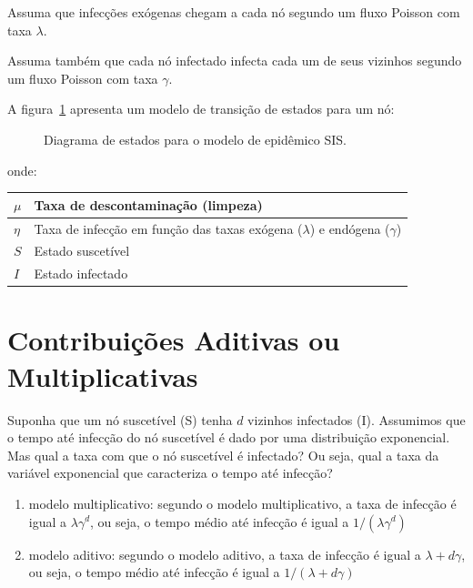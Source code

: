\documentclass[a4paper]{article}
\begin{document}
Assuma que infecções exógenas chegam a cada nó segundo um fluxo Poisson com taxa $\lambda$.   

Assuma também que cada nó infectado infecta cada um de seus vizinhos segundo um fluxo Poisson com taxa $\gamma$.

A figura~\ref{fig:SISmodel} apresenta um modelo de transição de estados para um nó:

\begin{figure}[!htb]
\begin{center}
 
\caption{Diagrama de estados para o modelo de epidêmico SIS.}
\label{fig:SISmodel}
\end{center}
\end{figure} 

onde:
\begin{table}[!htb]
\center
	\begin{tabular}{|l|l|}
    \hline
	$\mu$	&	Taxa de descontaminação (limpeza)	\\ 
    \hline
	$\eta$	&	Taxa de infecção em função das taxas exógena ($\lambda$) e endógena ($\gamma$)\\ 
    \hline
	$S$		&	Estado suscetível \\ 
    \hline
	$I$		&	Estado infectado \\
    \hline
	\end{tabular} 
\end{table}


\section{Contribuições Aditivas ou Multiplicativas}

Suponha que um nó suscetível (S) tenha $d$ vizinhos infectados (I).  Assumimos que o tempo até infecção do nó suscetível é dado por uma distribuição exponencial.
Mas qual a taxa com que o nó suscetível é infectado? Ou seja, qual a taxa da variável exponencial que caracteriza o tempo até infecção? 
\begin{enumerate}
\item modelo multiplicativo: segundo o modelo multiplicativo, a taxa de infecção é igual a $\lambda \gamma^d$, ou seja, o tempo médio até infecção é igual a $1/(\lambda \gamma^d)$
\item modelo aditivo: segundo o modelo aditivo, a taxa de infecção é igual a $\lambda + d \gamma$, ou seja, o tempo médio até infecção é igual a $1/(\lambda +d\gamma)$
\end{enumerate}
\end{document}
